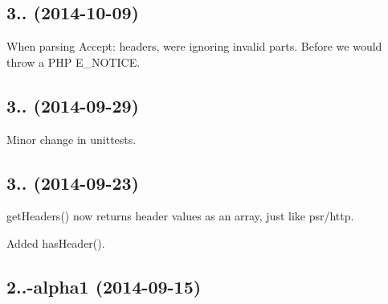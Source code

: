 \subsection*{3.. (2014-\/10-\/09) }


\begin{DoxyItemize}
\item When parsing {\ttfamily Accept\+:} headers, we\textquotesingle{}re ignoring invalid parts. Before we would throw a P\+HP E\+\_\+\+N\+O\+T\+I\+CE.
\end{DoxyItemize}

\subsection*{3.. (2014-\/09-\/29) }


\begin{DoxyItemize}
\item Minor change in unittests.
\end{DoxyItemize}

\subsection*{3.. (2014-\/09-\/23) }


\begin{DoxyItemize}
\item {\ttfamily get\+Headers()} now returns header values as an array, just like psr/http.
\item Added {\ttfamily has\+Header()}.
\end{DoxyItemize}

\subsection*{2..-\/alpha1 (2014-\/09-\/15) }


